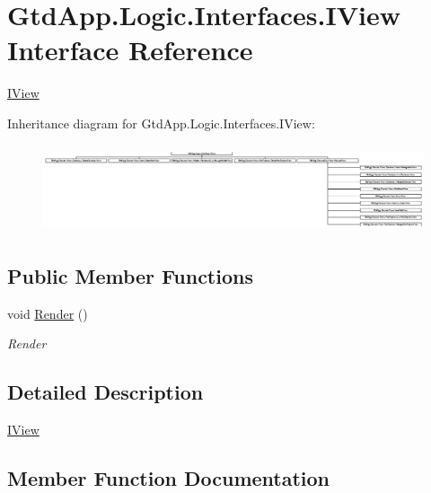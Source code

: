 \hypertarget{interface_gtd_app_1_1_logic_1_1_interfaces_1_1_i_view}{}\section{Gtd\+App.\+Logic.\+Interfaces.\+I\+View Interface Reference}
\label{interface_gtd_app_1_1_logic_1_1_interfaces_1_1_i_view}


\mbox{\hyperlink{interface_gtd_app_1_1_logic_1_1_interfaces_1_1_i_view}{I\+View}}  


Inheritance diagram for Gtd\+App.\+Logic.\+Interfaces.\+I\+View\+:\begin{figure}[H]
\begin{center}
\leavevmode
\includegraphics[height=2.573099cm]{interface_gtd_app_1_1_logic_1_1_interfaces_1_1_i_view}
\end{center}
\end{figure}
\subsection*{Public Member Functions}
\begin{DoxyCompactItemize}
\item 
void \mbox{\hyperlink{interface_gtd_app_1_1_logic_1_1_interfaces_1_1_i_view_a38544ad3bed7acb83711278dd38a33e8}{Render}} ()
\begin{DoxyCompactList}\small\item\em Render \end{DoxyCompactList}\end{DoxyCompactItemize}


\subsection{Detailed Description}
\mbox{\hyperlink{interface_gtd_app_1_1_logic_1_1_interfaces_1_1_i_view}{I\+View}} 



\subsection{Member Function Documentation}
\mbox{\label{interface_gtd_app_1_1_logic_1_1_interfaces_1_1_i_view_a38544ad3bed7acb83711278dd38a33e8}} 
